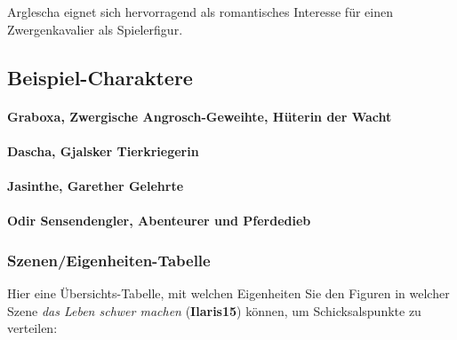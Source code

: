 Arglescha eignet sich hervorragend als romantisches Interesse für einen Zwergenkavalier als Spielerfigur.



\spaltenende
\newpage
\subsection{Beispiel-Charaktere}
\paragraph{Graboxa, Zwergische Angrosch-Geweihte, Hüterin der Wacht}
\paragraph{Dascha, Gjalsker Tierkriegerin}
\paragraph{Jasinthe, Garether Gelehrte}
\paragraph{Odir Sensendengler, Abenteurer und Pferdedieb}
\subsubsection{Szenen/Eigenheiten-Tabelle}
Hier eine Übersichts-Tabelle, mit welchen Eigenheiten Sie den Figuren in welcher Szene \emph{das Leben schwer machen} (\textbf{Ilaris15}) können, um Schicksalspunkte zu verteilen:


